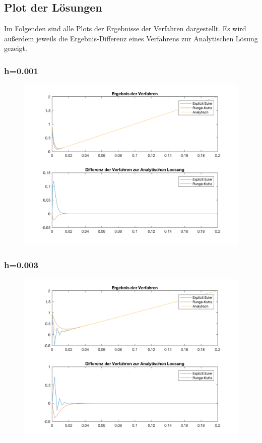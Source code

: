 \documentclass[]{scrartcl}
\begin{document}
\subsection{Plot der Lösungen}
Im Folgenden sind alle Plots der Ergebnisse der Verfahren dargestellt. Es wird außerdem jeweils die Ergebnis-Differenz eines Verfahrens zur Analytischen Lösung gezeigt.
\subsubsection{h=0.001}
\begin{figure}[htbp]
\centering
\includegraphics[width=1\linewidth]{a1_1_1}
\caption{}
\label{fig:a1_1_1}
\end{figure}

\subsubsection{h=0.003}
\begin{figure}[htbp]
	\centering
	\includegraphics[width=1\linewidth]{a1_1_2}
	\caption{}
	\label{fig:a1_1_2}
\end{figure}
\end{document}
